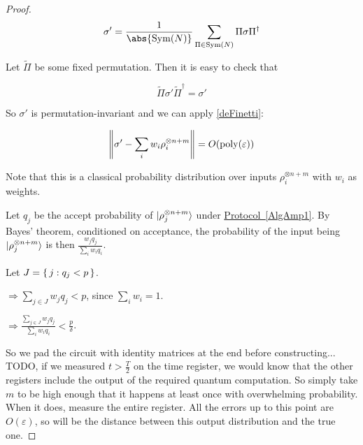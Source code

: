 \begin{proof}
$$\sigma'=\frac{1}{\abs{\Sym(N)}}\sum_{\Pi\in\Sym(N)}\Pi\sigma\Pi^\dagger$$

Let $\tilde{\Pi}$ be some fixed permutation. Then it is easy to check that

$$\tilde{\Pi}\sigma'\tilde{\Pi}^\dagger=\sigma'$$

So $\sigma'$ is permutation-invariant and we can apply \autoref{deFinetti}:

$$\left\lVert\sigma'-\sum_i w_i\rho_i^{\otimes n+m}\right\rVert=O(\operatorname*{\operatorname{poly}}(\varepsilon))$$

Note that this is a classical probability distribution over inputs $\rho_i^{\otimes n+m}$ with $w_i$ as weights.

Let $q_j$ be the accept probability of $\ket{\rho_j^{\otimes n+m}}$ under \hyperref[AlgAmp1]{Protocol~\ref*{AlgAmp1}}. By Bayes' theorem, conditioned on acceptance, the probability of the input being $\ket{\rho_j^{\otimes n+m}}$ is then $\frac{w_j q_j}{\sum_i w_i q_i}$.

Let $J=\set{j:q_j<p}$.

$\Rightarrow\sum_{j\in J} w_j q_j<p$, since $\sum_i w_i=1$.

$\Rightarrow\frac{\sum_{j\in J} w_j q_j}{\sum_i w_i q_i}<\frac{p}{\delta}$.

So we pad the circuit with identity matrices at the end before constructing... TODO, if we measured $t>\frac{T}{2}$ on the time register, we would know that the other registers include the output of the required quantum computation. So simply take $m$ to be high enough that it happens at least once with overwhelming probability. When it does, measure the entire register. All the errors up to this point are $O(\varepsilon)$, so will be the distance between this output distribution and the true one.

\end{proof}
